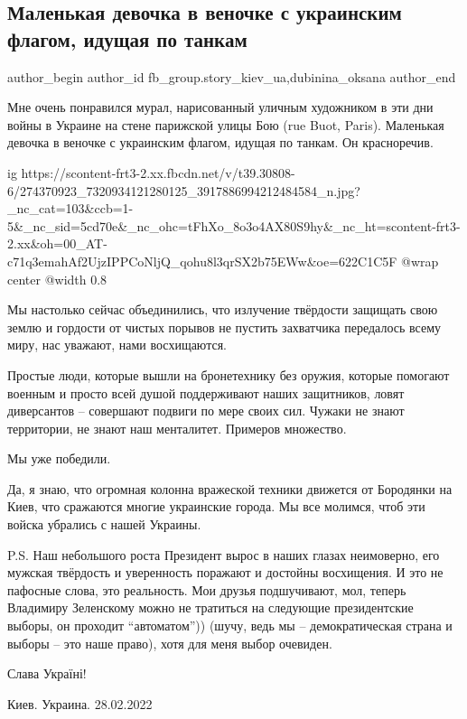  
 
 
 
 
 
\subsection{Маленькая девочка в веночке с украинским флагом, идущая по танкам}
\label{sec:28_02_2022.fb.fb_group.story_kiev_ua.3.mural}
 
\ifcmt
 author_begin
   author_id fb_group.story_kiev_ua,dubinina_oksana
 author_end
\fi

Мне очень понравился мурал, нарисованный уличным художником  в эти дни войны в
Украине на стене парижской улицы Бою (rue Buot, Paris). Маленькая девочка в
веночке с украинским флагом, идущая по танкам. Он красноречив. 

\ifcmt
  ig https://scontent-frt3-2.xx.fbcdn.net/v/t39.30808-6/274370923_7320934121280125_3917886994212484584_n.jpg?_nc_cat=103&ccb=1-5&_nc_sid=5cd70e&_nc_ohc=tFhXo_8o3o4AX80S9hy&_nc_ht=scontent-frt3-2.xx&oh=00_AT-c71q3emahAf2UjzIPPCoNljQ_qohu8l3qrSX2b75EWw&oe=622C1C5F
  @wrap center
  @width 0.8
\fi

Мы настолько сейчас объединились, что излучение твёрдости защищать свою землю и
гордости от чистых порывов не пустить захватчика передалось всему  миру, нас
уважают, нами восхищаются.

Простые люди, которые вышли на бронетехнику без оружия, которые помогают
военным и просто всей душой поддерживают наших защитников, ловят диверсантов  –
совершают подвиги по мере своих сил. Чужаки не знают территории, не знают наш
менталитет.  Примеров множество.

Мы уже победили. 

Да, я знаю, что огромная колонна вражеской техники движется от Бородянки на
Киев, что сражаются многие украинские города. Мы все молимся, чтоб эти войска
убрались с нашей Украины. 

P.S. Наш небольшого роста Президент вырос в наших глазах неимоверно, его
мужская твёрдость и уверенность поражают и достойны восхищения. И это не
пафосные слова, это реальность. Мои друзья подшучивают, мол, теперь Владимиру
Зеленскому можно не тратиться на следующие президентские выборы, он проходит
\enquote{автоматом})) (шучу, ведь мы – демократическая страна и выборы – это наше
право), хотя для меня выбор очевиден.

Слава Україні!

Киев. Украина. 28.02.2022

